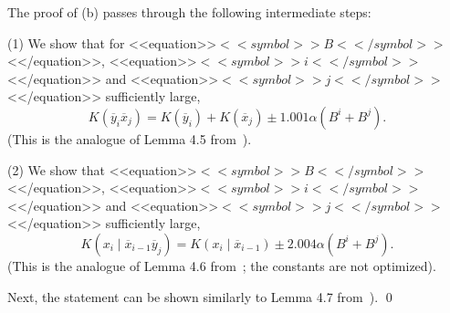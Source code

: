\documentclass[proceedings]{stacs}
\newcommand{\barx}{\overline{x}}
\newcommand{\bary}{\overline{y}}
\begin{document}
The proof of (b) passes through the following intermediate steps:

(1) We show that for <<equation>>$<<symbol>>B<</symbol>>$<</equation>>, <<equation>>$<<symbol>>i<</symbol>>$<</equation>> and <<equation>>$<<symbol>>j<</symbol>>$<</equation>> sufficiently large, $$K(\bary_i \barx_j) = K(\bary_i) + K(\barx_j) \pm 1.001 \alpha (B^i + B^j).$$ (This is the analogue of Lemma 4.5 from~\cite{zim:c:csr}).

(2) We show that <<equation>>$<<symbol>>B<</symbol>>$<</equation>>, <<equation>>$<<symbol>>i<</symbol>>$<</equation>> and <<equation>>$<<symbol>>j<</symbol>>$<</equation>> sufficiently large, $$K(x_i \mid \barx_{i-1} \bary_j) = K(x_i \mid \barx_{i-1}) \pm 2.004 \alpha (B^i + B^j).$$ (This is the analogue of Lemma 4.6 from~\cite{zim:c:csr}; the constants are not optimized).

Next, the statement can be shown similarly to Lemma 4.7 from~\cite{zim:c:csr}).
\qed
\end{document}
